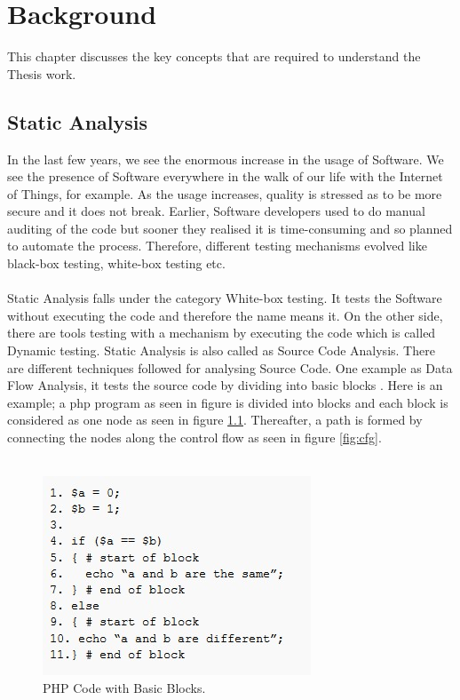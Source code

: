\chapter{Background}
\label{ch:background}

This chapter discusses the key concepts that are required to understand the Thesis work.

\section{Static Analysis}

In the last few years, we see the enormous increase in the usage of Software. We see the presence of Software everywhere in the walk of our life with the Internet of Things, for example. As the usage increases, quality is stressed as to be more secure and it does not break. Earlier, Software developers used to do manual auditing of the code but sooner they realised it is time-consuming and so planned to automate the process. Therefore, different testing mechanisms evolved like black-box testing, white-box testing etc. \\ \\

Static Analysis falls under the category White-box testing. It tests the Software without executing the code and therefore the name means it. On the other side, there are tools testing with a mechanism by executing the code which is called Dynamic testing. Static Analysis is also called as Source Code Analysis. There are different techniques followed for analysing Source Code. One example as Data Flow Analysis, it tests the source code by dividing into basic blocks \cite{Woegerer}. Here is an example; a php program as seen in figure is divided into blocks and each block is considered as one node as seen in figure \ref{fig:php}. Thereafter, a path is formed by connecting the nodes along the control flow as seen in figure \ref{fig:cfg}. \\ \\

\begin{figure}[H]
	\centering
	\includegraphics[scale=0.5]{figures/PHP-code}
	\caption{PHP Code with Basic Blocks.}
	\label{fig:php}
\end{figure}

